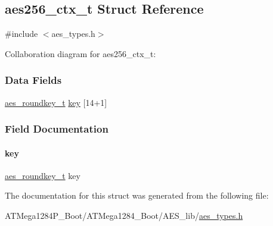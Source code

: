 \hypertarget{structaes256__ctx__t}{}\subsection{aes256\+\_\+ctx\+\_\+t Struct Reference}
\label{structaes256__ctx__t}


{\ttfamily \#include $<$aes\+\_\+types.\+h$>$}



Collaboration diagram for aes256\+\_\+ctx\+\_\+t\+:
\subsubsection*{Data Fields}
\begin{DoxyCompactItemize}
\item 
\hyperlink{structaes__roundkey__t}{aes\+\_\+roundkey\+\_\+t} \hyperlink{structaes256__ctx__t_a79177bf189cfb0e038bc4120398ebcc0}{key} \mbox{[}14+1\mbox{]}
\end{DoxyCompactItemize}


\subsubsection{Field Documentation}
\mbox{\label{structaes256__ctx__t_a79177bf189cfb0e038bc4120398ebcc0}} 
\paragraph{\texorpdfstring{key}{key}}
{\footnotesize\ttfamily \hyperlink{structaes__roundkey__t}{aes\+\_\+roundkey\+\_\+t} key}



The documentation for this struct was generated from the following file\+:\begin{DoxyCompactItemize}
\item 
A\+T\+Mega1284\+P\+\_\+\+Boot/\+A\+T\+Mega1284\+\_\+\+Boot/\+A\+E\+S\+\_\+lib/\hyperlink{_a_t_mega1284_p___boot_2_a_t_mega1284___boot_2_a_e_s__lib_2aes__types_8h}{aes\+\_\+types.\+h}\end{DoxyCompactItemize}
